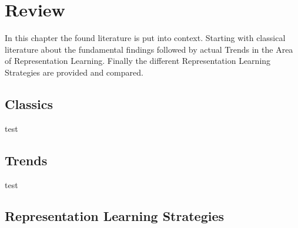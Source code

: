 \chapter{Review}
In this chapter the found literature is put into context. Starting with classical literature about the fundamental findings followed by actual Trends in the Area of Representation Learning. Finally the different Representation Learning Strategies are provided and compared.
\section{Classics}
test
\section{Trends}
test
\section{Representation Learning Strategies}